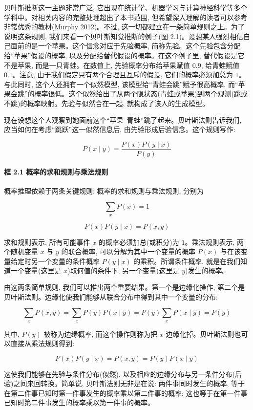 贝叶斯推断这一主题非常广泛, 它出现在统计学、机器学习与计算神经科学等多个学科中。对相关内容的完整处理超出了本书范围, 但希望深入理解的读者可以参考非常优秀的教材(Murphy 2012)。不过, 这一切都建立在一条简单规则之上。为了说明这条规则, 我们来看一个贝叶斯知觉推断的例子(图 2.1)。设想某人强烈相信自己面前的是一个苹果。这个信念对应于先验概率, 简称先验。这个先验包含分配给``苹果''假设的概率, 以及分配给替代假设的概率。在这个例子里, 替代假设是它不是苹果, 而是一只青蛙。在数值上, 先验概率分布给苹果赋值 $0.9$, 给青蛙赋值 $0.1$。注意, 由于我们假定只有两个合理且互斥的假设, 它们的概率必须加总为 $1$。与此同时, 这个人还拥有一个似然模型, 该模型给``青蛙会跳''赋予很高概率, 而``苹果会跳''的概率很低。这个似然给出了从两个隐状态(青蛙或苹果)到两个观测(跳或不跳)的概率映射。先验与似然合在一起, 就构成了该人的生成模型。

现在设想这个人观察到她面前这个``苹果--青蛙''跳了起来。贝叶斯法则告诉我们, 应当如何在考虑``跳跃''这一似然信息后, 由先验形成后验信念。这个规则写作:

\begin{equation}
P(x \mid y) = \frac{P(x)P(y \mid x)}{P(y)}
\tag{2.1}
\end{equation}

\paragraph{框 2.1 概率的求和规则与乘法规则}

概率推理依赖于两条关键规则: 概率的求和规则与乘法规则, 分别为

\[
\sum_x P(x) = 1
\]

\[
P(x)P(y \mid x) = P(x, y)
\]

求和规则表示, 所有可能事件 $x$ 的概率必须加总(或积分)为 $1$。乘法规则表示, 两个随机变量 $x$ 与 $y$ 的联合概率, 可以分解为其中一个变量的概率 $P(x)$ 与在该变量给定时另一个变量的条件概率 $P(y \mid x)$ 的乘积。所谓条件概率, 就是在我们知道一个变量(这里是 $x$)取何值的条件下, 另一个变量(这里是 $y$)发生的概率。

由这两条简单规则, 我们可以推出两个重要结果。第一个是边缘化操作, 第二个是贝叶斯法则。边缘化使我们能够从联合分布中得到其中一个变量的分布:

\[
\sum_x P(x, y) = \sum_x P(y)P(x \mid y) = P(y)\sum_x P(x \mid y) = P(y)
\]

其中, $P(y)$ 被称为边缘概率, 而这个操作则称为把 $x$ 边缘化掉。贝叶斯法则也可以直接从乘法规则得到:

\[
P(x)P(y \mid x) = P(x, y) = P(y)P(x \mid y)
\]

这使我们能够在先验与条件分布(似然), 以及相应的边缘分布与另一条件分布(后验)之间来回转换。简单说, 贝叶斯法则无非是在说: 两件事同时发生的概率, 等于在第二件事已知时第一件事发生的概率乘以第二件事的概率; 这也等于在第一件事已知时第二件事发生的概率乘以第一件事的概率。

